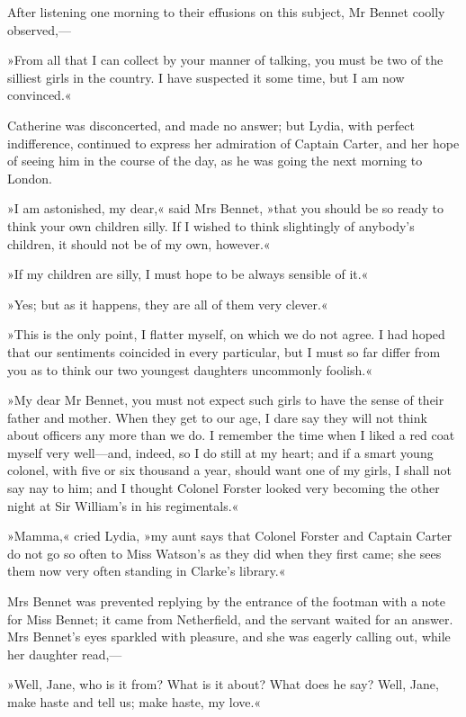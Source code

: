 After listening one morning to their effusions on this subject, Mr Bennet coolly observed,—

»From all that I can collect by your manner of talking, you must be two of the silliest girls in the country. I have suspected it some time, but I am now convinced.«

Catherine was disconcerted, and made no answer; but Lydia, with perfect indifference, continued to express her admiration of Captain Carter, and her hope of seeing him in the course of the day, as he was going the next morning to London.

»I am astonished, my dear,« said Mrs Bennet, »that you should be so ready to think your own children silly. If I wished to think slightingly of anybody's children, it should not be of my own, however.«

»If my children are silly, I must hope to be always sensible of it.«

»Yes; but as it happens, they are all of them very clever.«

»This is the only point, I flatter myself, on which we do not agree. I had hoped that our sentiments coincided in every particular, but I must so far differ from you as to think our two youngest daughters uncommonly foolish.«

»My dear Mr Bennet, you must not expect such girls to have the sense of their father and mother. When they get to our age, I dare say they will not think about officers any more than we do. I remember the time when I liked a red coat myself very well—and, indeed, so I do still at my heart; and if a smart young colonel, with five or six thousand a year, should want one of my girls, I shall not say nay to him; and I thought Colonel Forster looked very becoming the other night at Sir William's in his regimentals.«

»Mamma,« cried Lydia, »my aunt says that Colonel Forster and Captain Carter do not go so often to Miss Watson's as they did when they first came; she sees them now very often standing in Clarke's library.«

Mrs Bennet was prevented replying by the entrance of the footman with a note for Miss Bennet; it came from Netherfield, and the servant waited for an answer. Mrs Bennet's eyes sparkled with pleasure, and she was eagerly calling out, while her daughter read,—

»Well, Jane, who is it from? What is it about? What does he say? Well, Jane, make haste and tell us; make haste, my love.«

